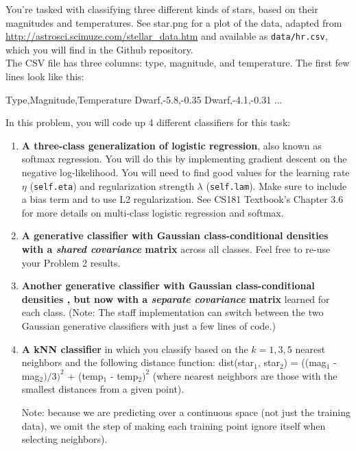 \documentclass[submit]{harvardml}
\begin{document}
\begin{problem}

You're tasked with classifying three different kinds of stars, based
on their magnitudes and temperatures. See star.png for a plot of
the data, adapted from
\url{http://astrosci.scimuze.com/stellar_data.htm} and available as
\verb|data/hr.csv|, which you will find in the Github repository. \\

The CSV file has three columns: type, magnitude, and temperature. The
first few lines look like this:
\begin{csv}
Type,Magnitude,Temperature
Dwarf,-5.8,-0.35
Dwarf,-4.1,-0.31
...
\end{csv}

In this problem, you will code up 4 different classifiers for this task:
\begin{enumerate}[label=\alph*)]
\item \textbf{A three-class generalization of logistic regression}, also
  known as softmax regression. You will do this by
  implementing gradient descent on the negative log-likelihood. You
  will need to find good values for the learning rate $\eta$ (\texttt{self.eta}) and
  regularization strength $\lambda$ (\texttt{self.lam}). Make sure to include a bias term and to
  use L2 regularization. See CS181 Textbook's Chapter 3.6 for more details on multi-class
  logistic regression and softmax.
  
\item \textbf{A generative classifier with Gaussian class-conditional
  densities with a \textit{shared covariance} matrix} across all classes. 
  Feel free to re-use your Problem 2 results.
\item \textbf{Another generative classifier with Gaussian class-conditional densities , but now 
with a \textit{separate covariance} matrix} learned for each class. (Note: 
The staff implementation can switch between the two Gaussian generative classifiers with just a
few lines of code.)

\item \textbf{A kNN classifier} in which you classify based on the $k=1,3,5$ nearest neighbors and the following distance function: dist(star$_1$, star$_2$) = ((mag$_1$ - mag$_2)/3)^2$ + (temp$_1$ - temp$_2)^2$ (where nearest neighbors are those with the smallest distances from a given point). 

Note: because we are predicting over a continuous space (not just the training data), we omit the step of making each training point ignore itself when selecting neighbors).


\end{enumerate}
\end{problem}
\end{document}
